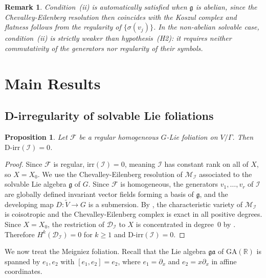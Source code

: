 \documentclass[12pt,a4paper]{article}
\newtheorem{proposition}[theorem]{Proposition}
\newtheorem{remark}[theorem]{Remark}
\begin{document}
\begin{remark}
Condition~(ii) is automatically satisfied when $\mathfrak{g}$ is abelian,
since the Chevalley-Eilenberg resolution then coincides with the Koszul
complex and flatness follows from the regularity of $\{\sigma(v_j)\}$.
In the non-abelian solvable case, condition~(ii) is strictly weaker than
hypothesis~(H2): it requires neither commutativity of the generators nor
regularity of their symbols.
\end{remark}

\section{Main Results}\label{main}

\subsection{D-irregularity of solvable Lie foliations}

\begin{proposition}\label{prop:regular}
Let $\mathcal{F}$ be a regular homogeneous $G$-Lie foliation on $V/\Gamma$.
Then $\mathrm{D\text{-}irr}(\mathcal{I}) = 0$.
\end{proposition}

\begin{proof}
Since $\mathcal{F}$ is regular, $\mathrm{irr}(\mathcal{I}) = 0$, meaning
$\mathcal{I}$ has constant rank on all of $X$, so $X = X_0$.
We use the Chevalley-Eilenberg resolution of $\mathcal{M}_{\mathcal{I}}$
associated to the solvable Lie algebra $\mathfrak{g}$ of $G$. Since
$\mathcal{F}$ is homogeneous, the generators $v_1,\ldots,v_r$ of
$\mathcal{I}$ are globally defined invariant vector fields forming a basis
of $\mathfrak{g}$, and the developing map $D: \widetilde{V} \to G$ is a
submersion. By \cite[Prop.~3.3]{D16}, the characteristic variety of
$\mathcal{M}_{\mathcal{I}}$ is coisotropic and the Chevalley-Eilenberg
complex is exact in all positive degrees. Since $X = X_0$, the restriction
of $\mathcal{D}_{\mathcal{I}}$ to $X$ is concentrated in degree~$0$ by
\cite[Rem.~3.5(ii)]{D16}. Therefore
$H^k(\mathcal{D}_{\mathcal{I}}) = 0$ for $k \geq 1$ and
$\mathrm{D\text{-}irr}(\mathcal{I}) = 0$.
\end{proof}

We now treat the Meigniez foliation. Recall that the Lie algebra
$\mathfrak{ga}$ of $\mathrm{GA}(\mathbb{R})$ is spanned by $e_1, e_2$
with $[e_1,e_2]=e_2$, where $e_1 = \partial_x$ and $e_2 = x\partial_x$
in affine coordinates.
\end{document}
